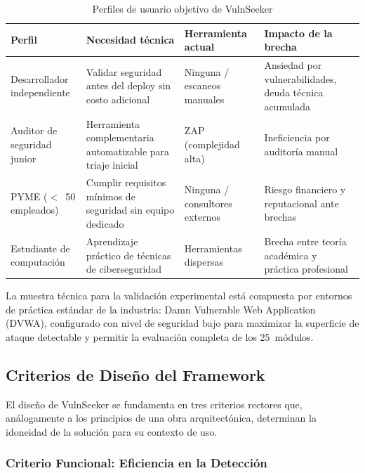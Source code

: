 \documentclass[12pt, a4paper]{article}
\begin{document}
\begin{table}[H]
    \centering
    \caption{Perfiles de usuario objetivo de VulnSeeker}
    \label{tab:perfiles}
    \small
    \begin{tabular}{p{2.5cm} p{4cm} p{3cm} p{3.5cm}}
        \toprule
        \textbf{Perfil} & \textbf{Necesidad técnica} &
        \textbf{Herramienta actual} & \textbf{Impacto de la brecha} \\
        \midrule
        Desarrollador independiente &
            Validar seguridad antes del deploy sin costo adicional &
            Ninguna / escaneos manuales &
            Ansiedad por vulnerabilidades, deuda técnica acumulada \\
        Auditor de seguridad junior &
            Herramienta complementaria automatizable para triaje inicial &
            ZAP (complejidad alta) &
            Ineficiencia por auditoría manual \\
        PYME ($<$~50 empleados) &
            Cumplir requisitos mínimos de seguridad sin equipo dedicado &
            Ninguna / consultores externos &
            Riesgo financiero y reputacional ante brechas \\
        Estudiante de computación &
            Aprendizaje práctico de técnicas de ciberseguridad &
            Herramientas dispersas &
            Brecha entre teoría académica y práctica profesional \\
        \bottomrule
    \end{tabular}
\end{table}

La muestra técnica para la validación experimental está compuesta por entornos
de práctica estándar de la industria: Damn Vulnerable Web Application (DVWA),
configurado con nivel de seguridad bajo para maximizar la superficie de ataque
detectable y permitir la evaluación completa de los 25~módulos.

\subsection{Criterios de Diseño del Framework}

El diseño de VulnSeeker se fundamenta en tres criterios rectores que,
análogamente a los principios de una obra arquitectónica, determinan la
idoneidad de la solución para su contexto de uso.

\subsubsection{Criterio Funcional: Eficiencia en la Detección}
\end{document}
